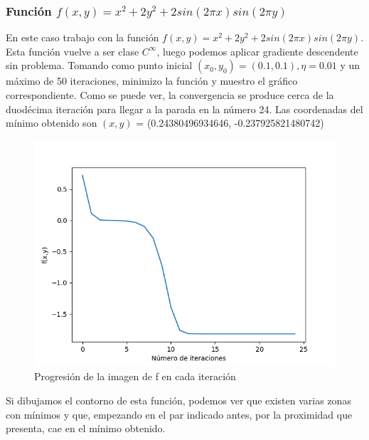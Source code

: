 \subsubsection{Función $f(x,y)=x^2+2y^2+2sin(2\pi x) sin(2\pi y)$}

En este caso trabajo con la función $f(x,y)=x^2+2y^2+2sin(2\pi x) sin(2\pi y)$. Esta función vuelve a ser clase $C^{\infty}$, luego podemos aplicar gradiente descendente sin problema. Tomando como punto inicial $(x_0,y_0) = (0.1,0.1), \eta = 0.01$ y un máximo de 50 iteraciones, minimizo la función y muestro el gráfico correspondiente. Como se puede ver, la convergencia se produce cerca de la duodécima iteración para llegar a la parada en la número 24. Las coordenadas del mínimo obtenido son $(x,y)$ = (0.24380496934646, -0.237925821480742)

\begin{figure}[H] %
	\centering
	\includegraphics[scale=0.6]{f1.png}  %
	\caption{Progresión de la imagen de f en cada iteración} 
	\label{fig:f1}
\end{figure}

Si dibujamos el contorno de esta función, podemos ver que existen varias zonas con mínimos y que, empezando en el par indicado antes, por la proximidad que presenta, cae en el mínimo obtenido.

